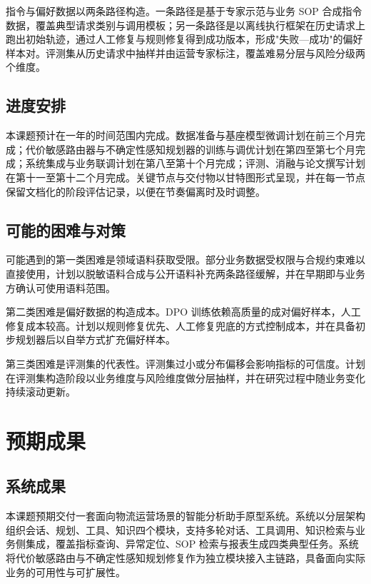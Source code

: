 指令与偏好数据以两条路径构造。一条路径是基于专家示范与业务 SOP 合成指令数据，覆盖典型请求类别与调用模板；另一条路径是以离线执行框架在历史请求上跑出初始轨迹，通过人工修复与规则修复得到成功版本，形成"失败—成功"的偏好样本对。评测集从历史请求中抽样并由运营专家标注，覆盖难易分层与风险分级两个维度。

\section{进度安排}

本课题预计在一年的时间范围内完成。数据准备与基座模型微调计划在前三个月完成；代价敏感路由器与不确定性感知规划器的训练与调优计划在第四至第七个月完成；系统集成与业务联调计划在第八至第十个月完成；评测、消融与论文撰写计划在第十一至第十二个月完成。关键节点与交付物以甘特图形式呈现，并在每一节点保留文档化的阶段评估记录，以便在节奏偏离时及时调整。

\section{可能的困难与对策}

可能遇到的第一类困难是领域语料获取受限。部分业务数据受权限与合规约束难以直接使用，计划以脱敏语料合成与公开语料补充两条路径缓解，并在早期即与业务方确认可使用语料范围。

第二类困难是偏好数据的构造成本。DPO 训练依赖高质量的成对偏好样本，人工修复成本较高。计划以规则修复优先、人工修复兜底的方式控制成本，并在具备初步规划器后以自举方式扩充偏好样本。

第三类困难是评测集的代表性。评测集过小或分布偏移会影响指标的可信度。计划在评测集构造阶段以业务维度与风险维度做分层抽样，并在研究过程中随业务变化持续滚动更新。


\chapter{预期成果}

\section{系统成果}

本课题预期交付一套面向物流运营场景的智能分析助手原型系统。系统以分层架构组织会话、规划、工具、知识四个模块，支持多轮对话、工具调用、知识检索与业务侧集成，覆盖指标查询、异常定位、SOP 检索与报表生成四类典型任务。系统将代价敏感路由与不确定性感知规划修复作为独立模块接入主链路，具备面向实际业务的可用性与可扩展性。

